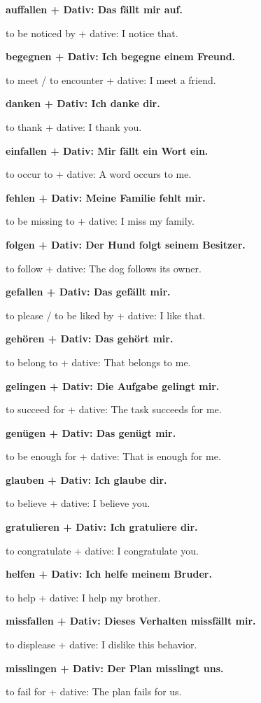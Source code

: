 \documentclass[a4paper]{article}
\newcommand{\EN}[1]{\par{\small\textcolor{TranslationGray}{#1}}\vspace{0.4em}}
\begin{document}
            \textbf{auffallen + Dativ: Das fällt mir auf.}
            \EN{to be noticed by + dative: I notice that.}
            
            \textbf{begegnen + Dativ: Ich begegne einem Freund.}
            \EN{to meet / to encounter + dative: I meet a friend.}
            
            \textbf{danken + Dativ: Ich danke dir.}
            \EN{to thank + dative: I thank you.}
            
            \textbf{einfallen + Dativ: Mir fällt ein Wort ein.}
            \EN{to occur to + dative: A word occurs to me.}
            
            \textbf{fehlen + Dativ: Meine Familie fehlt mir.}
            \EN{to be missing to + dative: I miss my family.}
            
            \textbf{folgen + Dativ: Der Hund folgt seinem Besitzer.}
            \EN{to follow + dative: The dog follows its owner.}
            
            \textbf{gefallen + Dativ: Das gefällt mir.}
            \EN{to please / to be liked by + dative: I like that.}
            
            \textbf{gehören + Dativ: Das gehört mir.}
            \EN{to belong to + dative: That belongs to me.}
            
            \textbf{gelingen + Dativ: Die Aufgabe gelingt mir.}
            \EN{to succeed for + dative: The task succeeds for me.}
            
            \textbf{genügen + Dativ: Das genügt mir.}
            \EN{to be enough for + dative: That is enough for me.}
            
            \textbf{glauben + Dativ: Ich glaube dir.}
            \EN{to believe + dative: I believe you.}
            
            \textbf{gratulieren + Dativ: Ich gratuliere dir.}
            \EN{to congratulate + dative: I congratulate you.}
            
            \textbf{helfen + Dativ: Ich helfe meinem Bruder.}
            \EN{to help + dative: I help my brother.}
            
            \textbf{missfallen + Dativ: Dieses Verhalten missfällt mir.}
            \EN{to displease + dative: I dislike this behavior.}
            
            \textbf{misslingen + Dativ: Der Plan misslingt uns.}
            \EN{to fail for + dative: The plan fails for us.}
            
\end{document}
